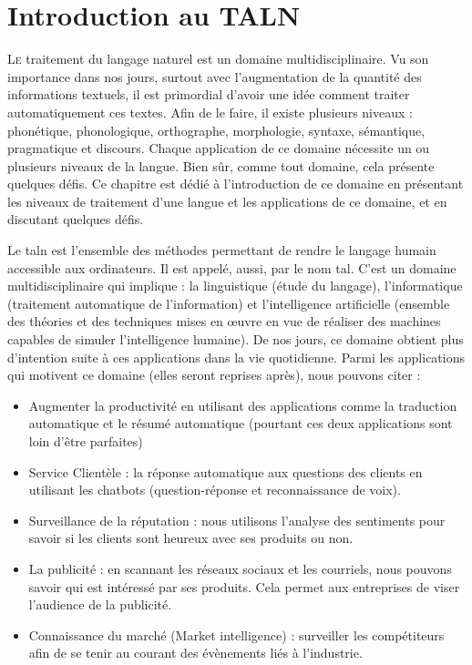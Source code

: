 \documentclass{KodeBook}
\begin{document}
		\mainmatter
	
\fi
\chapter{Introduction au TALN}

\begin{introduction}
	\lettrine{L}{e} traitement du langage naturel est un domaine multidisciplinaire. 
	Vu son importance dans nos jours, surtout avec l'augmentation de la quantité des informations textuels, il est primordial d'avoir une idée comment traiter automatiquement ces textes. 
	Afin de le faire, il existe plusieurs niveaux : phonétique, phonologique, orthographe, morphologie, syntaxe, sémantique, pragmatique et discours. 
	Chaque application de ce domaine nécessite un ou plusieurs niveaux de la langue. 
	Bien sûr, comme tout domaine, cela présente quelques défis. 
	Ce chapitre est dédié à l'introduction de ce domaine en présentant les niveaux de traitement d'une langue et les applications de ce domaine, et en discutant quelques défis.
\end{introduction} 

Le \ac{taln} est l'ensemble des méthodes permettant de rendre le langage humain accessible aux ordinateurs.
Il est appelé, aussi, par le nom \ac{tal}. 
C'est un domaine multidisciplinaire qui implique : la linguistique (étude du langage), l'informatique (traitement automatique de l'information) et l'intelligence artificielle (ensemble des théories et des techniques mises en œuvre en vue de réaliser des machines capables de simuler l'intelligence humaine).
De nos jours, ce domaine obtient plus d'intention suite à ces applications dans la vie quotidienne. 
Parmi les applications qui motivent ce domaine (elles seront reprises après), nous pouvons citer :
\begin{itemize}
	\item Augmenter la productivité en utilisant des applications comme la traduction automatique et le résumé automatique (pourtant ces deux applications sont loin d'être parfaites)
	
	\item Service Clientèle : la réponse automatique aux questions des clients en utilisant les chatbots (question-réponse et reconnaissance de voix). 
	
	\item Surveillance de la réputation : nous utilisons l'analyse des sentiments pour savoir si les clients sont heureux avec ses produits ou non. 
	
	\item La publicité : en scannant les réseaux sociaux et les courriels, nous pouvons savoir qui est intéressé par ses produits. Cela permet aux entreprises de viser l'audience de la publicité. 
	
	\item Connaissance du marché (Market intelligence) : surveiller les compétiteurs afin de se tenir au courant des évènements liés à l'industrie.
\end{itemize}
\end{document}
